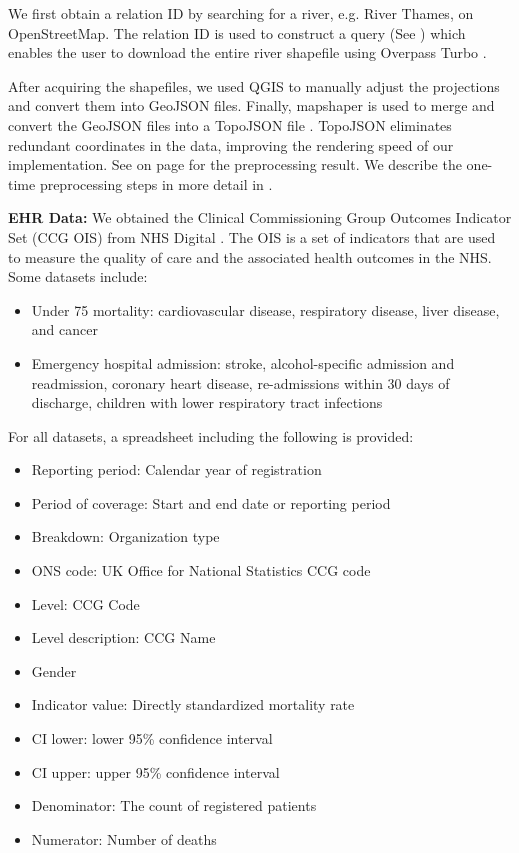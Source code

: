 \documentclass[Afour,sagev,times]{sagej}
\newcommand{\bobgraph}[1]{\noindent\textbf{#1}}
\begin{document}
We first obtain a relation ID by searching for a river, e.g.
River Thames, on OpenStreetMap.
The relation ID is used to construct a query (See ) which enables the user to download the entire river shapefile using Overpass Turbo \cite{overpassturboOverpass}.

After acquiring the shapefiles, we used QGIS \cite{qgisWelcome} to manually adjust the projections and convert them into GeoJSON files.
Finally, mapshaper \cite{blochMapshaper} is used to merge and convert the GeoJSON files into a TopoJSON file \cite{TopoJSON}.
TopoJSON eliminates redundant coordinates in the data, improving the rendering speed of our implementation.
See  on page \pageref{table:pre-processing_result} for the preprocessing result.
We describe the one-time preprocessing steps in more detail in .

\bobgraph{EHR Data: }We obtained the Clinical Commissioning Group Outcomes Indicator Set (CCG OIS) from NHS Digital \cite{nhsdigitalClinical}.
The OIS is a set of indicators that are used to measure the quality of care and the associated health outcomes in the NHS.
Some datasets include:
\begin{itemize}
    \setlength\itemsep{0px}
    \item Under 75 mortality: cardiovascular disease, respiratory disease, liver disease, and cancer
    \item Emergency hospital admission: stroke, alcohol-specific admission and readmission, coronary heart disease, re-admissions within 30 days of discharge, children with lower respiratory tract infections
\end{itemize}

For all datasets, a spreadsheet including the following is provided:

\begin{itemize}
    \setlength\itemsep{0px}
    \item Reporting period: Calendar year of registration
    \item Period of coverage: Start and end date or reporting period
    \item Breakdown: Organization type
    \item ONS code: UK Office for National Statistics CCG code
    \item Level: CCG Code
    \item Level description: CCG Name
    \item Gender
    \item Indicator value: Directly standardized mortality rate
    \item CI lower: lower 95\% confidence interval
    \item CI upper: upper 95\% confidence interval
    \item Denominator: The count of registered patients
    \item Numerator: Number of deaths
\end{itemize}
\end{document}
